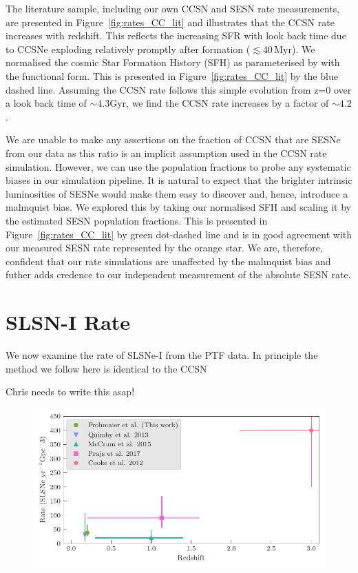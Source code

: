 \documentclass[a4paper,fleqn,usenatbib]{mnras}
\begin{document}
The literature sample, including our own CCSN and SESN rate measurements, are presented in Figure~\ref{fig:rates_CC_lit} and illustrates that the CCSN rate increases with redshift. This reflects the increasing SFR with look back time due to CCSNe exploding relatively promptly after formation ($\lesssim40\,\mathrm{Myr}$). We normalised the cosmic Star Formation History (SFH) as parameterised by \citet{2008MNRAS.388.1487L} with the \citet{2001MNRAS.326..255C} functional form. This is presented in Figure~\ref{fig:rates_CC_lit} by the blue dashed line. Assuming the CCSN rate follows this simple evolution from z=0 over a look back time of $\sim4.3$Gyr, we find the CCSN rate increases by a factor of $\sim 4.2$.

We are unable to make any assertions on the fraction of CCSN that are SESNe from our data as this ratio is an implicit assumption used in the CCSN rate simulation. However, we can use the \citet{2017PASP..129e4201S} population fractions to probe any systematic biases in our simulation pipeline. It is natural to expect that the brighter intrinsic luminosities of SESNe would make them easy to discover and, hence, introduce a malmquist bias. We explored this by taking our normalised SFH and scaling it by the estimated SESN population fractions. This is presented in Figure~\ref{fig:rates_CC_lit} by green dot-dashed line and is in good agreement with our measured SESN rate represented by the orange star. We are, therefore, confident that our rate simulations are unaffected by the malmquist bias and futher adds credence to our independent measurement of the absolute SESN rate.


\section{SLSN-I Rate}

We now examine the rate of SLSNe-I from the PTF data. In principle the method we follow here is identical to the CCSN 

Chris needs to write this asap!


\begin{figure}
	\includegraphics[width=\linewidth]{./SLSN_Compare_Literature.pdf}
    \caption{}
    \label{fig:rates_SLSN_Lit}
\end{figure}
\end{document}
